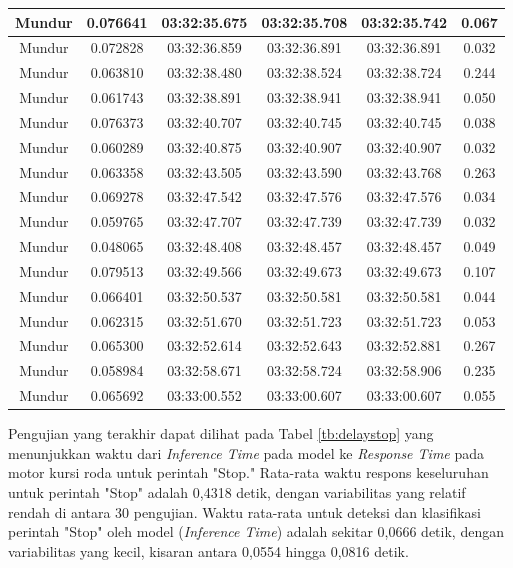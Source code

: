 \begin{longtable}{|c|c|c|c|c|c|}
      Mundur & 0.076641 & 03:32:35.675 & 03:32:35.708 & 03:32:35.742 & 0.067 \\ \hline
      Mundur & 0.072828 & 03:32:36.859 & 03:32:36.891 & 03:32:36.891 & 0.032 \\ \hline
      Mundur & 0.063810 & 03:32:38.480 & 03:32:38.524 & 03:32:38.724 & 0.244 \\ \hline
      Mundur & 0.061743 & 03:32:38.891 & 03:32:38.941 & 03:32:38.941 & 0.050 \\ \hline
      Mundur & 0.076373 & 03:32:40.707 & 03:32:40.745 & 03:32:40.745 & 0.038 \\ \hline
      Mundur & 0.060289 & 03:32:40.875 & 03:32:40.907 & 03:32:40.907 & 0.032 \\ \hline
      Mundur & 0.063358 & 03:32:43.505 & 03:32:43.590 & 03:32:43.768 & 0.263 \\ \hline
      Mundur & 0.069278 & 03:32:47.542 & 03:32:47.576 & 03:32:47.576 & 0.034 \\ \hline
      Mundur & 0.059765 & 03:32:47.707 & 03:32:47.739  & 03:32:47.739  & 0.032 \\ \hline
      Mundur & 0.048065 & 03:32:48.408 & 03:32:48.457 & 03:32:48.457 & 0.049 \\ \hline
      Mundur & 0.079513 & 03:32:49.566 & 03:32:49.673 & 03:32:49.673 & 0.107 \\ \hline
      Mundur & 0.066401 & 03:32:50.537 & 03:32:50.581 & 03:32:50.581 & 0.044 \\ \hline
      Mundur & 0.062315 & 03:32:51.670 & 03:32:51.723 & 03:32:51.723 & 0.053 \\ \hline
      Mundur & 0.065300 & 03:32:52.614 & 03:32:52.643 & 03:32:52.881 & 0.267 \\ \hline
      Mundur & 0.058984 & 03:32:58.671 & 03:32:58.724  & 03:32:58.906 & 0.235 \\ \hline
      Mundur & 0.065692 & 03:33:00.552 & 03:33:00.607 & 03:33:00.607 & 0.055 \\ \hline
\end{longtable}

Pengujian yang terakhir dapat dilihat pada Tabel \ref{tb:delaystop} yang menunjukkan waktu dari \emph{Inference Time} pada model ke \emph{Response Time} pada motor kursi roda untuk perintah "Stop." Rata-rata waktu respons keseluruhan untuk perintah "Stop" adalah 0,4318 detik, dengan variabilitas yang relatif rendah di antara 30 pengujian. Waktu rata-rata untuk deteksi dan klasifikasi perintah "Stop" oleh model (\emph{Inference Time}) adalah sekitar 0,0666 detik, dengan variabilitas yang kecil, kisaran antara 0,0554 hingga 0,0816 detik.

